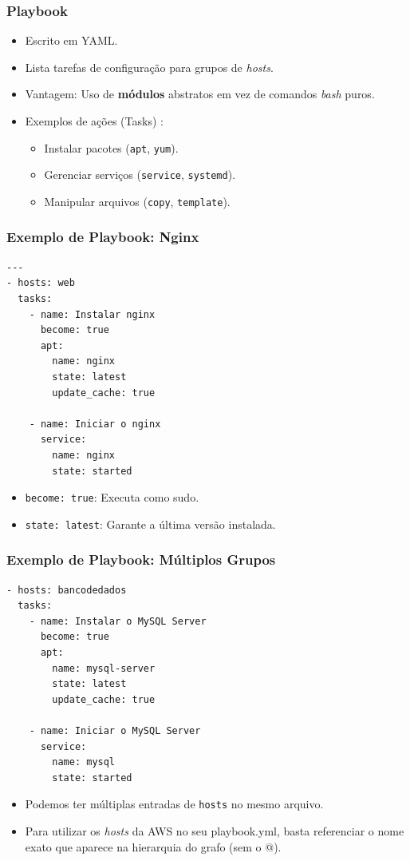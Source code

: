 \documentclass{beamer}
\begin{document}
   \begin{frame}
      \frametitle{Playbook}
      \begin{itemize}
      \item Escrito em YAML.
      \item Lista tarefas de configuração para grupos de \textit{hosts}.
      \item Vantagem: Uso de \textbf{módulos} abstratos em vez de comandos \textit{bash} puros.
      \item Exemplos de ações (Tasks) :
      \begin{itemize}
      \item Instalar pacotes (\texttt{apt}, \texttt{yum}).
      \item Gerenciar serviços (\texttt{service}, \texttt{systemd}).
      \item Manipular arquivos (\texttt{copy}, \texttt{template}).
      \end{itemize}
      \end{itemize}
   \end{frame}

   \begin{frame}[fragile]
      \frametitle{Exemplo de Playbook: Nginx}
      \begin{verbatim}
---
- hosts: web
  tasks:
    - name: Instalar nginx
      become: true
      apt:
        name: nginx
        state: latest
        update_cache: true

    - name: Iniciar o nginx
      service:
        name: nginx
        state: started
      \end{verbatim}
      \begin{itemize}
      \item \texttt{become: true}: Executa como sudo.
      \item \texttt{state: latest}: Garante a última versão instalada.
      \end{itemize}
   \end{frame}

   \begin{frame}[fragile]
      \frametitle{Exemplo de Playbook: Múltiplos Grupos}
      \footnotesize
      \begin{verbatim}
- hosts: bancodedados
  tasks:
    - name: Instalar o MySQL Server
      become: true
      apt:
        name: mysql-server
        state: latest
        update_cache: true

    - name: Iniciar o MySQL Server
      service:
        name: mysql
        state: started
      \end{verbatim}
      \normalsize
      \begin{itemize}
      \item Podemos ter múltiplas entradas de \texttt{hosts} no mesmo arquivo.
      \item Para utilizar os \textit{hosts} da AWS no seu playbook.yml, basta referenciar o nome exato que aparece na hierarquia do grafo (sem o @).
      \end{itemize}
   \end{frame}
\end{document}
